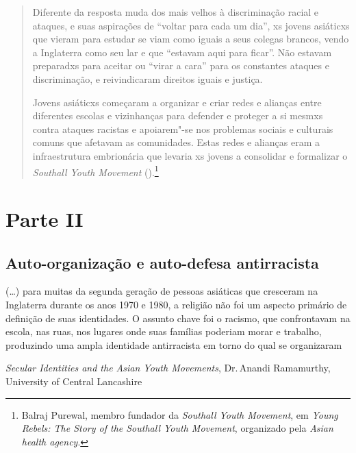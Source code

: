 \begin{quote}
Diferente da resposta muda dos mais velhos à discriminação racial e ataques, e suas aspirações de ``voltar para cada um dia'', xs jovens asiáticxs que vieram para estudar se viam como iguais a seus colegas brancos, vendo a Inglaterra como seu lar e que ``estavam aqui para ficar''. Não estavam preparadxs para aceitar ou ``virar a cara'' para os constantes ataques e discriminação, e reivindicaram direitos iguais e justiça.

Jovens asiáticxs começaram a organizar e criar redes e alianças entre diferentes escolas e vizinhanças para defender e proteger a si mesmxs contra ataques racistas e apoiarem"-se nos problemas sociais e culturais comuns que afetavam as comunidades. Estas redes e alianças eram a infraestrutura embrionária que levaria xs jovens a consolidar e formalizar o \emph{Southall Youth Movement} ().\footnote{Balraj Purewal, membro fundador da \emph{Southall Youth Movement}, em \emph{Young Rebels: The Story of the Southall Youth Movement}, organizado pela \emph{Asian health agency}.}
\end{quote}



\section{Parte II}

\subsection{Auto-organização e auto-defesa antirracista}

\epigraph{(\ldots{}) para muitas da segunda geração de pessoas asiáticas que cresceram na Inglaterra durante os anos 1970 e 1980, a religião não foi um aspecto primário de definição de suas identidades. O assunto chave foi o racismo, que confrontavam na escola, nas ruas, nos lugares onde suas famílias poderiam morar e trabalho, produzindo uma ampla identidade antirracista em torno do qual se organizaram}{\textit{Secular Identities and the Asian Youth Movements}, Dr.\,Anandi Ramamurthy, University of Central Lancashire}

